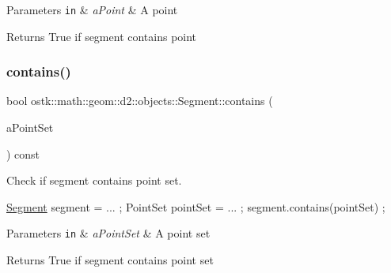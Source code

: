 \begin{DoxyParams}[1]{Parameters}
\mbox{\tt in}  & {\em a\+Point} & A point \\
\hline
\end{DoxyParams}
\begin{DoxyReturn}{Returns}
True if segment contains point 
\end{DoxyReturn}
\mbox{\label{classostk_1_1math_1_1geom_1_1d2_1_1objects_1_1_segment_afd9fea7d6b73c7136ddb1246e20134d3}} 
\subsubsection{\texorpdfstring{contains()}{contains()}\hspace{0.1cm}{\footnotesize\ttfamily [2/2]}}
{\footnotesize\ttfamily bool ostk\+::math\+::geom\+::d2\+::objects\+::\+Segment\+::contains (\begin{DoxyParamCaption}\item[{const \hyperlink{classostk_1_1math_1_1geom_1_1d2_1_1objects_1_1_point_set}{Point\+Set} \&}]{a\+Point\+Set }\end{DoxyParamCaption}) const}



Check if segment contains point set. 


\begin{DoxyCode}
\hyperlink{classostk_1_1math_1_1geom_1_1d2_1_1objects_1_1_segment_a56c91f22315d7cefe9d5e9973330028d}{Segment} segment = ... ;
PointSet pointSet = ... ;
segment.contains(pointSet) ;
\end{DoxyCode}



\begin{DoxyParams}[1]{Parameters}
\mbox{\tt in}  & {\em a\+Point\+Set} & A point set \\
\hline
\end{DoxyParams}
\begin{DoxyReturn}{Returns}
True if segment contains point set 
\end{DoxyReturn}
\mbox{\label{classostk_1_1math_1_1geom_1_1d2_1_1objects_1_1_segment_a691c0ef8268b6c3628e1cb69beb9ed74}} 
